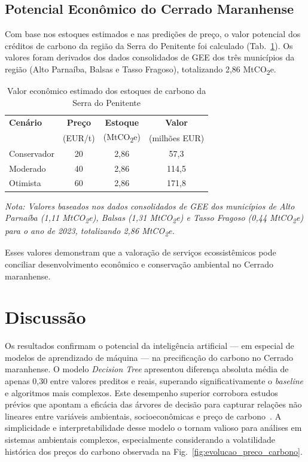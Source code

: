 \documentclass[conference]{IEEEtran}
\begin{document}
\subsection{Potencial Econômico do Cerrado Maranhense}

Com base nos estoques estimados e nas predições de preço, o valor potencial dos créditos de carbono da região da Serra do Penitente foi calculado (Tab.~\ref{tab:valor}).  
Os valores foram derivados dos dados consolidados de GEE dos três municípios da região (Alto Parnaíba, Balsas e Tasso Fragoso), totalizando 2,86 MtCO\textsubscript{2}e.

\begin{table}[!t]
  \caption{Valor econômico estimado dos estoques de carbono da Serra do Penitente}\label{tab:valor}
  \centering
  \footnotesize
  \begin{tabular}{lccc}
    \toprule
    \textbf{Cenário} & \textbf{Preço} & \textbf{Estoque} & \textbf{Valor} \\
                     & (EUR/t) & (MtCO\textsubscript{2}e) & (milhões EUR) \\ \midrule
    Conservador & 20 & 2,86 & 57,3 \\
    Moderado    & 40 & 2,86 & 114,5 \\
    Otimista    & 60 & 2,86 & 171,8 \\ \bottomrule
  \end{tabular}
  \footnotesize
  \textit{Nota: Valores baseados nos dados consolidados de GEE dos municípios de Alto Parnaíba (1,11 MtCO\textsubscript{2}e), Balsas (1,31 MtCO\textsubscript{2}e) e Tasso Fragoso (0,44 MtCO\textsubscript{2}e) para o ano de 2023, totalizando 2,86 MtCO\textsubscript{2}e.}
\end{table}

Esses valores demonstram que a valoração de serviços ecossistêmicos pode conciliar desenvolvimento econômico e conservação ambiental no Cerrado maranhense.


\section{Discussão}\label{sec:discussao}

Os resultados confirmam o potencial da inteligência artificial — em especial de modelos de aprendizado de máquina — na precificação do carbono no Cerrado maranhense.  
O modelo \emph{Decision Tree} apresentou diferença absoluta média de apenas 0,30 entre valores preditos e reais, superando significativamente o \emph{baseline} e algoritmos mais complexos.  
Este desempenho superior corrobora estudos prévios que apontam a eficácia das árvores de decisão para capturar relações não lineares entre variáveis ambientais, socioeconômicas e preço de carbono~\cite{kanda2023,cutler2007}.  
A simplicidade e interpretabilidade desse modelo o tornam valioso para análises em sistemas ambientais complexos, especialmente considerando a volatilidade histórica dos preços do carbono observada na Fig.~\ref{fig:evolucao_preco_carbono}.
\end{document}

